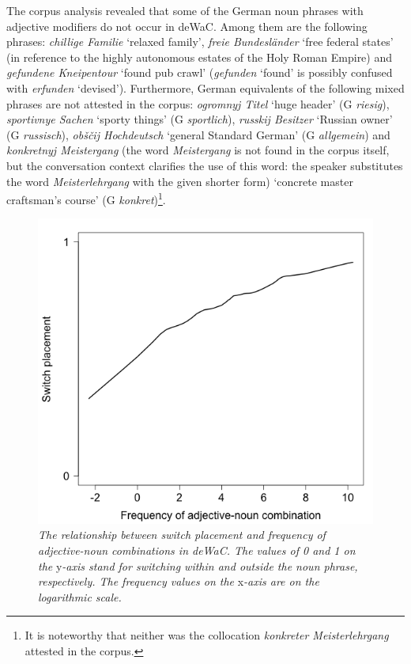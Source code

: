 The corpus analysis revealed that some of the German noun phrases with adjective modifiers do not occur in deWaC. Among them are the following phrases: \textit{chillige Familie} `relaxed family', \textit{freie Bundesländer} `free federal states' (in reference to the highly autonomous estates of the Holy Roman Empire) and \textit{gefundene Kneipentour} `found pub crawl' (\textit{gefunden} `found' is possibly confused with \textit{erfunden} `devised'). Furthermore, German equivalents of the following mixed phrases are not attested in the corpus: \textit{ogromnyj Titel} `huge header' (G \textit{riesig}), \textit{sportivnye Sachen} `sporty things' (G \textit{sportlich}), \textit{russkij Besitzer} `Russian owner' (G \textit{russisch}), \textit{obščij Hochdeutsch} `general Standard German' (G \textit{allgemein}) and \textit{konkretnyj Meistergang} (the word \textit{Meistergang} is not found in the corpus itself, but the conversation context clarifies the use of this word: the speaker substitutes the word \textit{Meisterlehrgang} with the given shorter form) `concrete master craftsman's course' (G \textit{konkret})\footnote{It is noteworthy that neither was the collocation \textit{konkreter Meisterlehrgang} attested in the corpus.}.

\begin{figure}
	\centering
    	\includegraphics[scale=0.5]{figures/4-Fr_co-occ.png}
	\caption{\textit{The relationship between switch placement and frequency of adjective-noun combinations in deWaC. The values of 0 and 1 on the} y\textit{-axis stand for switching within and outside the noun phrase, respectively. The frequency values on the} x\textit{-axis are on the logarithmic scale.}}
	\label{fig:4:co-occ}
\end{figure}

